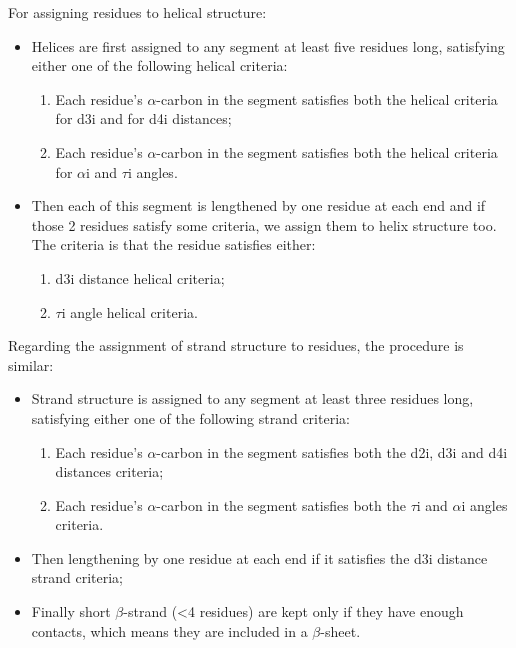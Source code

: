 For assigning residues to helical structure:
\begin{itemize}
    \item Helices are first assigned to any segment at least five residues long, satisfying either one of the following helical criteria:
        \begin{enumerate}
            \item Each residue's $\alpha$-carbon in the segment satisfies both the helical criteria for d3i and for d4i distances;
            \item Each residue's $\alpha$-carbon in the segment satisfies both the helical criteria for $\alpha$i and $\tau$i angles.
        \end{enumerate}
    \item Then each of this segment is lengthened by one residue at each end and if those 2 residues satisfy some criteria, we assign them to helix structure too. The criteria is that the residue satisfies either:
    \begin{enumerate}
        \item d3i distance helical criteria;
        \item $\tau$i angle helical criteria.
    \end{enumerate}
\end{itemize} 
Regarding the assignment of strand structure to residues, the procedure is similar:
\begin{itemize}
    \item Strand structure is assigned to any segment at least three residues long, satisfying either one of the following strand criteria:
    \begin{enumerate}
        \item Each residue's $\alpha$-carbon in the segment satisfies both the d2i, d3i and d4i distances criteria; 
        \item Each residue's $\alpha$-carbon in the segment satisfies both the $\tau$i and $\alpha$i angles criteria.
    \end{enumerate}
    \item Then lengthening by one residue at each end if it satisfies the d3i distance strand criteria;
    \item Finally short $\beta$-strand (<4 residues) are kept only if they have enough contacts, which means they are included in a $\beta$-sheet.
\end{itemize}


